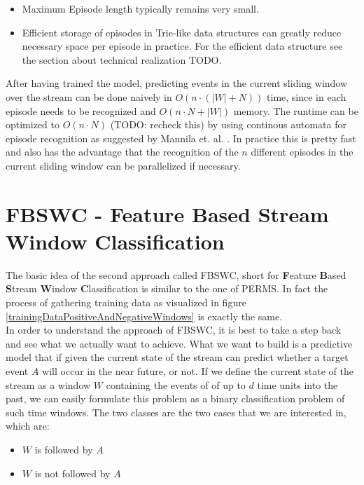 \begin{itemize}
	\item Maximum Episode length typically remains very small.
	\item Efficient storage of episodes in Trie-like data structures can greatly reduce necessary space per episode in practice. For the efficient data structure see the section about technical realization TODO.
\end{itemize}

After having trained the model, predicting events in the current sliding window over the stream can be done naively in $O(n \cdot (|W|+N))$ time, since in each episode needs to be recognized and $O(n \cdot N + |W|)$ memory. The runtime can be optimized to $O(n \cdot N)$ (TODO: recheck this) by using continous automata for episode recognition as suggested by Mannila et. al. \cite{mannila1997discovery}. In practice this is pretty fast and also has the advantage that the recognition of the $n$ different episodes in the current sliding window can be parallelized if necessary.

\section{FBSWC - Feature Based Stream Window Classification}
\label{sec_FeatureBasedStreamWindowClassification}

The basic idea of the second approach called FBSWC, short for \textbf{F}eature \textbf{B}ased \textbf{S}tream \textbf{W}indow \textbf{C}lassification is similar to the one of PERMS. In fact the process of gathering training data as visualized in figure \ref{trainingDataPositiveAndNegativeWindows} is exactly the same. \\
In order to understand the approach of FBSWC, it is best to take a step back and see what we actually want to achieve. What we want to build is a predictive model that if given the current state of the stream can predict whether a target event $A$ will occur in the near future, or not. If we define the current state of the stream as a window $W$ containing the events of of up to $d$ time units into the past, we can easily formulate this problem as a binary classification problem of such time windows. The two classes are the two cases that we are interested in, which are:

\begin{itemize}
	\item $W$ is followed by $A$
	\item $W$ is not followed by $A$
\end{itemize}

